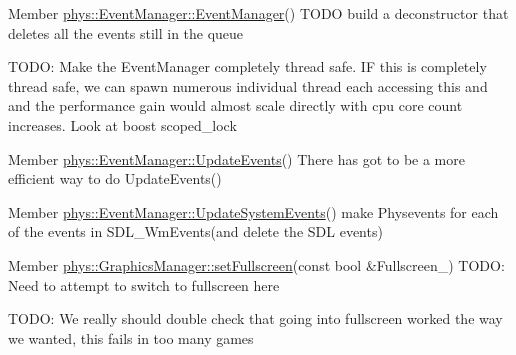 \label{dd/da0/todo__todo000009}
\hypertarget{dd/da0/todo__todo000009}{}
 
\begin{DoxyDescription}
\item[Member \hyperlink{classphys_1_1EventManager_a018b36588bf2a2e90536e64be060d6fc}{phys::EventManager::EventManager}() ]TODO build a deconstructor that deletes all the events still in the queue 

TODO: Make the EventManager completely thread safe. IF this is completely thread safe, we can spawn numerous individual thread each accessing this and and the performance gain would almost scale directly with cpu core count increases. Look at boost scoped\_\-lock 
\end{DoxyDescription}

\label{dd/da0/todo__todo000007}
\hypertarget{dd/da0/todo__todo000007}{}
 
\begin{DoxyDescription}
\item[Member \hyperlink{classphys_1_1EventManager_a63cf23dc9fe0ced3e2c60ca61c97b166}{phys::EventManager::UpdateEvents}() ]There has got to be a more efficient way to do UpdateEvents() 
\end{DoxyDescription}

\label{dd/da0/todo__todo000008}
\hypertarget{dd/da0/todo__todo000008}{}
 
\begin{DoxyDescription}
\item[Member \hyperlink{classphys_1_1EventManager_a0cf574c55def063d66d7db46a4d3e8a5}{phys::EventManager::UpdateSystemEvents}() ]make Physevents for each of the events in SDL\_\-WmEvents(and delete the SDL events) 
\end{DoxyDescription}

\label{dd/da0/todo__todo000011}
\hypertarget{dd/da0/todo__todo000011}{}
 
\begin{DoxyDescription}
\item[Member \hyperlink{classphys_1_1GraphicsManager_aafcf1824190e44d42a9bfbea9cfbe1b2}{phys::GraphicsManager::setFullscreen}(const bool \&Fullscreen\_\-) ]TODO: Need to attempt to switch to fullscreen here 

TODO: We really should double check that going into fullscreen worked the way we wanted, this fails in too many games 
\end{DoxyDescription}

\label{dd/da0/todo__todo000013}
\hypertarget{dd/da0/todo__todo000013}{}
 
